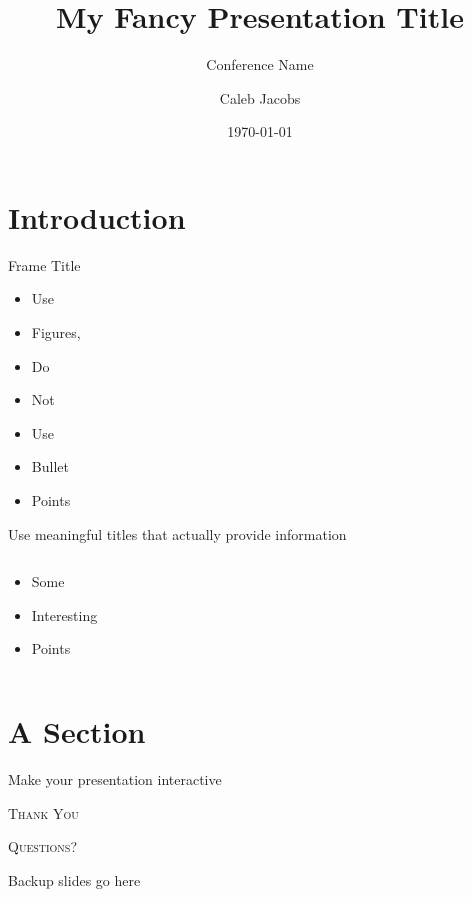 \documentclass{cubeamer}
\title{My Fancy Presentation Title}
\subtitle{Conference Name}
\author[Caleb Jacobs]{Caleb Jacobs}
\date{\today} %
\institute[University of Colorado Boulder]{Department of Applied Mathematics}
\begin{document}
\maketitle

\cutoc

\section{Introduction}

\begin{frame}{Frame Title}
    \begin{itemize}
        \item Use
        \item Figures,
        \item Do
        \item Not
        \item Use
        \item Bullet
        \item Points
    \end{itemize}
\end{frame}

\begin{frame}{Use meaningful titles that actually provide information}
    \begin{columns}
        \begin{column}{0.4\textwidth}
            \begin{itemize}
                \item Some
                \item Interesting
                \item Points
            \end{itemize}
        \end{column}
    \end{columns}
\end{frame}

\section{A Section}

\begin{frame}{Make your presentation interactive}
    \begin{cublock}
        \begin{overlayarea}{\textwidth}{\baselineskip}
        \end{overlayarea}
    \end{cublock}
\end{frame}

\begin{frame}[standout]
    \Huge\textsc{Thank You}
    
    \vfill
    
    \LARGE\textsc{Questions?}
\end{frame}

\appendix

\begin{frame}{Backup slides go here}
    
\end{frame}
\end{document}
